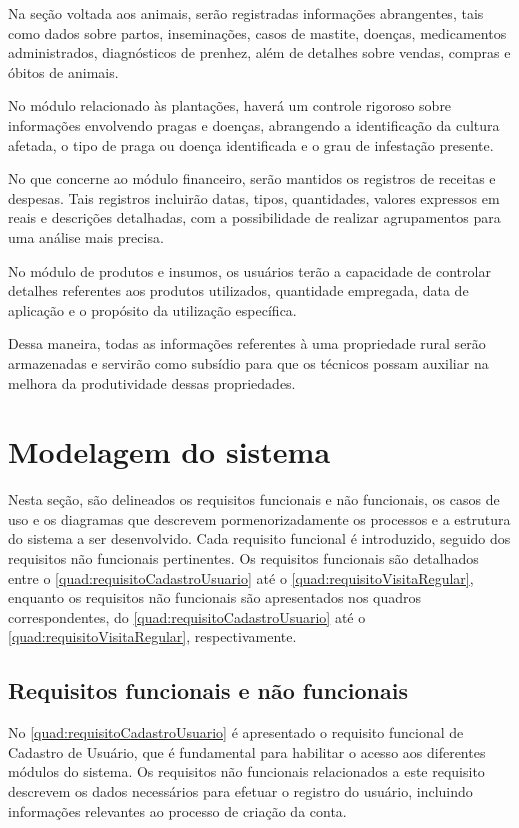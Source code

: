 Na seção voltada aos animais, serão registradas informações abrangentes, tais como dados sobre partos, inseminações, casos de mastite, doenças, medicamentos administrados, diagnósticos de prenhez, além de detalhes sobre vendas, compras e óbitos de animais.

No módulo relacionado às plantações, haverá um controle rigoroso sobre informações envolvendo pragas e doenças, abrangendo a identificação da cultura afetada, o tipo de praga ou doença identificada e o grau de infestação presente.

No que concerne ao módulo financeiro, serão mantidos os registros de receitas e despesas. Tais registros incluirão datas, tipos, quantidades, valores expressos em reais e descrições detalhadas, com a possibilidade de realizar agrupamentos para uma análise mais precisa.

No módulo de produtos e insumos, os usuários terão a capacidade de controlar detalhes referentes aos produtos utilizados, quantidade empregada, data de aplicação e o propósito da utilização específica.

Dessa maneira, todas as informações referentes à uma propriedade rural serão armazenadas e servirão como subsídio para que os técnicos possam auxiliar na melhora da produtividade dessas propriedades.


\section{Modelagem do sistema}\label{sec:modelagemSistema}

Nesta seção, são delineados os requisitos funcionais e não funcionais, os casos de uso e os diagramas que descrevem pormenorizadamente os processos e a estrutura do sistema a ser desenvolvido. Cada requisito funcional é introduzido, seguido dos requisitos não funcionais pertinentes.
Os requisitos funcionais são detalhados entre o \autoref{quad:requisitoCadastroUsuario} até o \autoref{quad:requisitoVisitaRegular}, enquanto os requisitos não funcionais são apresentados nos quadros correspondentes, do \autoref{quad:requisitoCadastroUsuario} até o \autoref{quad:requisitoVisitaRegular}, respectivamente.

\subsection{Requisitos funcionais e não funcionais}\label{subsec:requisitosFuncionaisNaoFuncionais}

No \autoref{quad:requisitoCadastroUsuario} é apresentado o requisito funcional de Cadastro de Usuário, que é fundamental para habilitar o acesso aos diferentes módulos do sistema. Os requisitos não funcionais relacionados a este requisito descrevem os dados necessários para efetuar o registro do usuário, incluindo informações relevantes ao processo de criação da conta.

